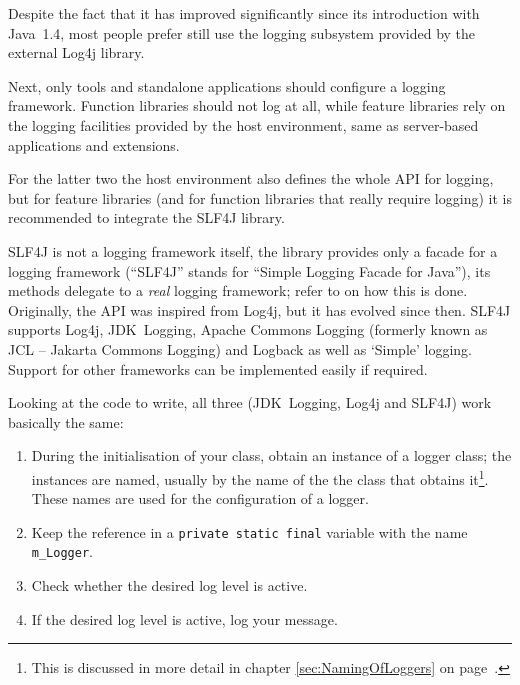 \documentclass[11pt,a4paper, titlepage, parskip=half, headsepline, footsepline, cleardoublepage=current, headheight=1cm]{scrbook}
\newcommand*{\tqvref}[1]{\hyperref[{#1}]{\ref*{#1}} on page~\pageref{#1}}
\begin{document}
Despite the fact that it has improved significantly since its introduction with Java~1.4, most people prefer still use the logging subsystem provided by the external Log4j\autocite{APACHE_LOG4J} library.

Next, only tools and standalone applications should configure a logging framework. Function libraries should not log at all, while feature libraries rely on the logging facilities provided by the host environment, same as server-based applications and extensions.

For the latter two the host environment also defines the whole API for logging, but for feature libraries (and for function libraries that really require logging) it is recommended to integrate the SLF4J\autocite{SLF4J} library.

SLF4J is not a logging framework itself, the library provides only a facade for a logging framework (“SLF4J” stands for “Simple Logging Facade for Java”), its methods delegate to a \textit{real} logging framework; refer to \autocite{SLF4J:Binding} on how this is done. Originally, the API was inspired from Log4j, but it has evolved since then. SLF4J supports Log4j, JDK~Logging, Apache Commons Logging\autocite{APACHE_COMMONS_LOGGING} (formerly known as JCL – Jakarta Commons Logging) and Logback\autocite{LOGBACK} as well as ‘Simple’ logging. Support for other frameworks can be implemented easily if required.

Looking at the code to write, all three (JDK~Logging, Log4j and SLF4J) work basically the same:
\begin{enumerate}[nosep]
\item{During the initialisation of your class, obtain an instance of a logger class; the instances are named, usually by the name of the the class that obtains it\footnote{This is discussed in more detail in chapter \tqvref{sec:NamingOfLoggers}.}. These names are used for the configuration of a logger.}

\item{Keep the reference in a \lstinline|private static final| variable with the name \lstinline|m_Logger|.}

\item{Check whether the desired log level is active.}

\item{If the desired log level is active, log your message.}
\end{enumerate}
\end{document}

